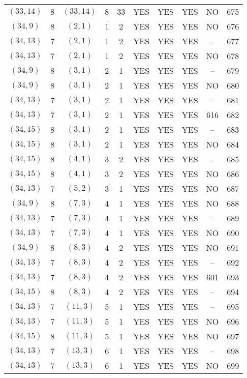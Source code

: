 \begin{longtable}{|c|c|c|c|c|c|c|c|c|c|}
$(33, 14)$ & 8 & $(33, 14)$ & 8 & 33 & YES & YES & YES & NO & 675\\
$(34, 9)$ & 8 & $(2, 1)$ & 1 & 2 & YES & YES & YES & NO & 676\\
$(34, 13)$ & 7 & $(2, 1)$ & 1 & 2 & YES & YES & YES & -- & 677\\
$(34, 13)$ & 7 & $(2, 1)$ & 1 & 2 & YES & YES & YES & NO & 678\\
$(34, 9)$ & 8 & $(3, 1)$ & 2 & 1 & YES & YES & YES & -- & 679\\
$(34, 9)$ & 8 & $(3, 1)$ & 2 & 1 & YES & YES & YES & NO & 680\\
$(34, 13)$ & 7 & $(3, 1)$ & 2 & 1 & YES & YES & YES & -- & 681\\
$(34, 13)$ & 7 & $(3, 1)$ & 2 & 1 & YES & YES & YES & 616 & 682\\
$(34, 15)$ & 8 & $(3, 1)$ & 2 & 1 & YES & YES & YES & -- & 683\\
$(34, 15)$ & 8 & $(3, 1)$ & 2 & 1 & YES & YES & YES & NO & 684\\
$(34, 15)$ & 8 & $(4, 1)$ & 3 & 2 & YES & YES & YES & -- & 685\\
$(34, 15)$ & 8 & $(4, 1)$ & 3 & 2 & YES & YES & YES & NO & 686\\
$(34, 13)$ & 7 & $(5, 2)$ & 3 & 1 & YES & YES & YES & NO & 687\\
$(34, 9)$ & 8 & $(7, 3)$ & 4 & 1 & YES & YES & YES & NO & 688\\
$(34, 13)$ & 7 & $(7, 3)$ & 4 & 1 & YES & YES & YES & -- & 689\\
$(34, 13)$ & 7 & $(7, 3)$ & 4 & 1 & YES & YES & YES & NO & 690\\
$(34, 9)$ & 8 & $(8, 3)$ & 4 & 2 & YES & YES & YES & NO & 691\\
$(34, 13)$ & 7 & $(8, 3)$ & 4 & 2 & YES & YES & YES & -- & 692\\
$(34, 13)$ & 7 & $(8, 3)$ & 4 & 2 & YES & YES & YES & 601 & 693\\
$(34, 15)$ & 8 & $(8, 3)$ & 4 & 2 & YES & YES & YES & -- & 694\\
$(34, 13)$ & 7 & $(11, 3)$ & 5 & 1 & YES & YES & YES & -- & 695\\
$(34, 13)$ & 7 & $(11, 3)$ & 5 & 1 & YES & YES & YES & NO & 696\\
$(34, 15)$ & 8 & $(11, 3)$ & 5 & 1 & YES & YES & YES & NO & 697\\
$(34, 13)$ & 7 & $(13, 3)$ & 6 & 1 & YES & YES & YES & -- & 698\\
$(34, 13)$ & 7 & $(13, 3)$ & 6 & 1 & YES & YES & YES & NO & 699\\

\end{longtable}
